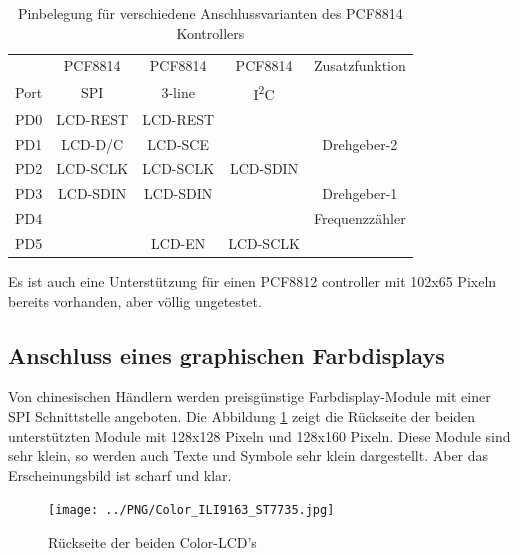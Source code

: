 \begin{table}[H]
  \begin{center}
    \begin{tabular}{| c || c | c | c | c |}
    \hline
           &  PCF8814    & PCF8814        & PCF8814     & Zusatzfunktion \\
      Port &    SPI      & 3-line         &   I\textsuperscript{2}C      & \\
    \hline
    \hline
    PD0    &   LCD-REST  & LCD-REST       &            & \\
    \hline
    PD1    &   LCD-D/C   & LCD-SCE        &             & Drehgeber-2 \\
    \hline
    PD2    &   LCD-SCLK  & LCD-SCLK       &  LCD-SDIN   & \\
    \hline
    PD3    &   LCD-SDIN  & LCD-SDIN       &             & Drehgeber-1 \\
    \hline
    PD4    &             &                &             & Frequenzzähler \\
    \hline
    PD5    &             & LCD-EN         &   LCD-SCLK  & \\
    \hline
    \end{tabular}
  \end{center}
  \caption{Pinbelegung für verschiedene Anschlussvarianten des PCF8814 Kontrollers}
  \label{tab:PCF8814-con}
\end{table}

Es ist auch eine Unterstützung für einen PCF8812 controller mit 102x65 Pixeln bereits vorhanden,
aber völlig ungetestet.

\subsection{Anschluss eines graphischen Farbdisplays}

Von chinesischen Händlern werden preisgünstige Farbdisplay-Module mit einer SPI Schnittstelle angeboten.
Die Abbildung \ref{fig:Color_both} zeigt die Rückseite der beiden unterstützten Module mit 128x128 Pixeln
und 128x160 Pixeln.
Diese Module sind sehr klein, so werden auch Texte und Symbole sehr klein dargestellt.
Aber das Erscheinungsbild ist scharf und klar.

\begin{figure}[H]
\centering
\texttt{[image: ../PNG/Color\_ILI9163\_ST7735.jpg]}
\caption{Rückseite der beiden Color-LCD's}
\label{fig:Color_both}
\end{figure}

